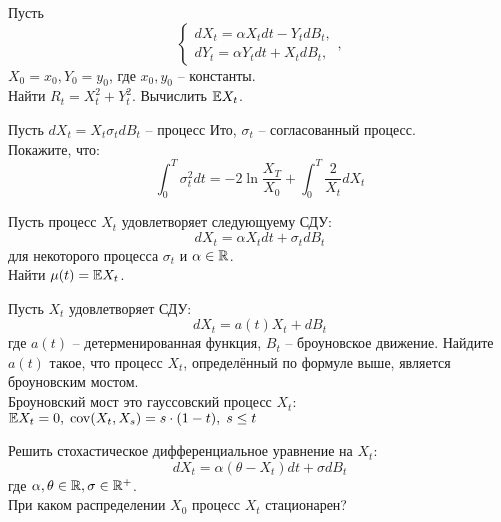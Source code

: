 \documentclass[12pt]{article}
\begin{document}
\begin{problem}
    Пусть
    $$\begin{cases}
        dX_t = \alpha X_t dt - Y_t dB_t, \\
        dY_t = \alpha Y_t dt + X_t dB_t,
    \end{cases},$$ $X_0=x_0, Y_0=y_0$, где $x_0, y_0$ -- константы.
    \\ Найти $R_t = X_t^2 + Y_t^2$. Вычислить $\mathbb{E} X_t$.
\end{problem}

\begin{problem}
    Пусть $dX_t = X_t \sigma_t dB_t$ -- процесс Ито, $\sigma_t$ -- согласованный процесс.
    \\ Покажите, что:
    $$
        \int_0^T \sigma^2_t dt = -2\ln \dfrac{X_T}{X_0} + \int_0^T \dfrac{2}{X_t}dX_t
    $$
\end{problem}

\begin{problem}
    Пусть процесс $X_t$ удовлетворяет следующуему СДУ:
    $$
        dX_t = \alpha X_t dt + \sigma_t dB_t
    $$для некоторого процесса $\sigma_t$ и $\alpha \in \mathbb{R}$. 
    \\ Найти $\mu(t)=\mathbb{E} X_t$.
\end{problem}

\begin{problem}
    Пусть $X_t$ удовлетворяет СДУ:    
    $$
        dX_t = a(t) X_t + dB_t
    $$ где $a(t)$ -- детерменированная функция, $B_t$ -- броуновское движение. 
    Найдите $a(t)$ такое, что процесс $X_t$, определённый по формуле выше, является броуновским мостом.
    \\ Броуновский мост это гауссовский процесс $X_t$: $\mathbb{E} X_t = 0, \; \mathrm{cov}(X_t, X_s) = s\cdot (1 - t), \; s \leq t$
\end{problem}

\begin{problem}
    Решить стохастическое дифференциальное уравнение на $X_t$:
    $$
        dX_t = \alpha (\theta -  X_t) dt + \sigma dB_t
    $$где $\alpha, \theta \in \mathbb{R}, \sigma \in \mathbb{R}^+$.
    \\
    При каком распределении $X_0$ процесс $X_t$ стационарен?
\end{problem}
\end{document}

